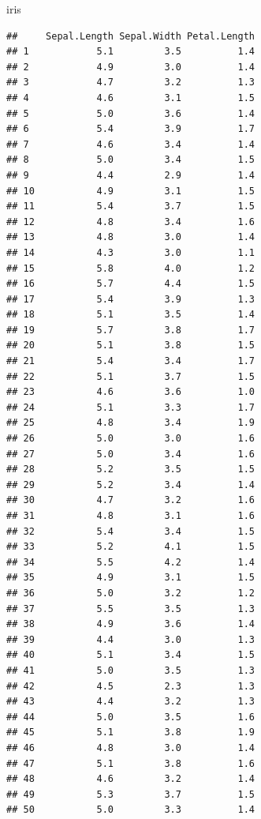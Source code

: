 \documentclass[
]{book}
\newenvironment{Shaded}{\begin{snugshade}}{\end{snugshade}}
\newcommand{\NormalTok}[1]{#1}
\begin{document}
\begin{Shaded}
\begin{Highlighting}[]
\NormalTok{iris}
\end{Highlighting}
\end{Shaded}

\begin{verbatim}
##     Sepal.Length Sepal.Width Petal.Length
## 1            5.1         3.5          1.4
## 2            4.9         3.0          1.4
## 3            4.7         3.2          1.3
## 4            4.6         3.1          1.5
## 5            5.0         3.6          1.4
## 6            5.4         3.9          1.7
## 7            4.6         3.4          1.4
## 8            5.0         3.4          1.5
## 9            4.4         2.9          1.4
## 10           4.9         3.1          1.5
## 11           5.4         3.7          1.5
## 12           4.8         3.4          1.6
## 13           4.8         3.0          1.4
## 14           4.3         3.0          1.1
## 15           5.8         4.0          1.2
## 16           5.7         4.4          1.5
## 17           5.4         3.9          1.3
## 18           5.1         3.5          1.4
## 19           5.7         3.8          1.7
## 20           5.1         3.8          1.5
## 21           5.4         3.4          1.7
## 22           5.1         3.7          1.5
## 23           4.6         3.6          1.0
## 24           5.1         3.3          1.7
## 25           4.8         3.4          1.9
## 26           5.0         3.0          1.6
## 27           5.0         3.4          1.6
## 28           5.2         3.5          1.5
## 29           5.2         3.4          1.4
## 30           4.7         3.2          1.6
## 31           4.8         3.1          1.6
## 32           5.4         3.4          1.5
## 33           5.2         4.1          1.5
## 34           5.5         4.2          1.4
## 35           4.9         3.1          1.5
## 36           5.0         3.2          1.2
## 37           5.5         3.5          1.3
## 38           4.9         3.6          1.4
## 39           4.4         3.0          1.3
## 40           5.1         3.4          1.5
## 41           5.0         3.5          1.3
## 42           4.5         2.3          1.3
## 43           4.4         3.2          1.3
## 44           5.0         3.5          1.6
## 45           5.1         3.8          1.9
## 46           4.8         3.0          1.4
## 47           5.1         3.8          1.6
## 48           4.6         3.2          1.4
## 49           5.3         3.7          1.5
## 50           5.0         3.3          1.4

\end{verbatim}
\end{document}
